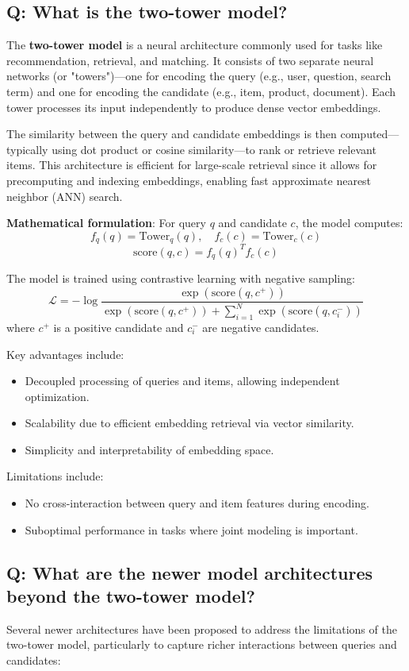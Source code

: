 \subsection*{Q: What is the two-tower model?}
The \textbf{two-tower model} is a neural architecture commonly used for tasks like recommendation, retrieval, and matching. It consists of two separate neural networks (or "towers")—one for encoding the query (e.g., user, question, search term) and one for encoding the candidate (e.g., item, product, document). Each tower processes its input independently to produce dense vector embeddings.

The similarity between the query and candidate embeddings is then computed—typically using dot product or cosine similarity—to rank or retrieve relevant items. This architecture is efficient for large-scale retrieval since it allows for precomputing and indexing embeddings, enabling fast approximate nearest neighbor (ANN) search.

\textbf{Mathematical formulation}:
For query \(q\) and candidate \(c\), the model computes:
\[
	f_q(q) = \text{Tower}_q(q), \quad f_c(c) = \text{Tower}_c(c)
\]
\[
	\text{score}(q, c) = f_q(q)^T f_c(c)
\]

The model is trained using contrastive learning with negative sampling:
\[
	\mathcal{L} = -\log \frac{\exp(\text{score}(q, c^+))}{\exp(\text{score}(q, c^+)) + \sum_{i=1}^{N} \exp(\text{score}(q, c_i^-))}
\]
where \(c^+\) is a positive candidate and \(c_i^-\) are negative candidates.

Key advantages include:
\begin{itemize}
	\item Decoupled processing of queries and items, allowing independent optimization.
	\item Scalability due to efficient embedding retrieval via vector similarity.
	\item Simplicity and interpretability of embedding space.
\end{itemize}

Limitations include:
\begin{itemize}
	\item No cross-interaction between query and item features during encoding.
	\item Suboptimal performance in tasks where joint modeling is important.
\end{itemize}

\subsection*{Q: What are the newer model architectures beyond the two-tower model?}
Several newer architectures have been proposed to address the limitations of the two-tower model, particularly to capture richer interactions between queries and candidates:

